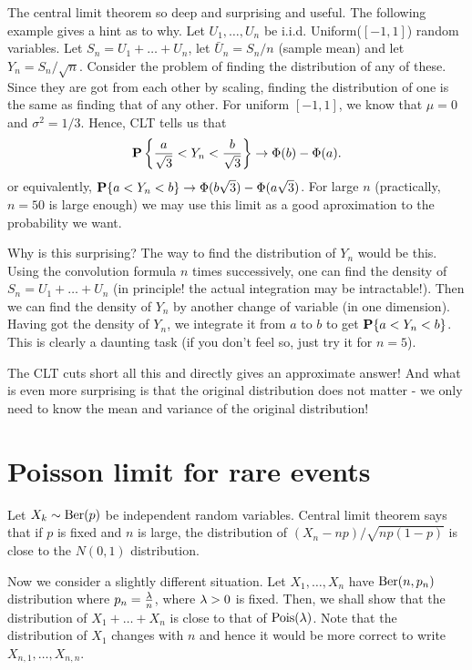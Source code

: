 \documentclass[preprint,  11pt]{amsart}
\def\sig{{\sigma}}
\begin{document}
The central limit theorem so deep and surprising and useful. The following example gives a hint as to why.
\beg Let $U_{1},\ldots ,U_{n}$ be i.i.d. Uniform($[-1,1]$) random variables. Let $S_{n}=U_{1}+\ldots +U_{n}$, let $\bar{U}_{n}=S_{n}/n$ (sample mean) and let $Y_{n}=S_{n}/\sqrt{n}$. Consider the problem of finding the distribution of any of these. Since they are got from each other by scaling, finding the distribution of one is the same as finding that of any other. For uniform $[-1,1]$, we know that $\mu=0$ and $\sig^{2}=1/3$. Hence, CLT tells us that
$$
\P\l\{\frac{a}{\sqrt{3}}<Y_{n}<\frac{b}{\sqrt{3}}\r\}\to \Phi(b)-\Phi(a).
$$
or equivalently, $\P\{a<Y_{n}<b\}\to \Phi(b\sqrt{3})-\Phi(a\sqrt{3})$. For large $n$ (practically, $n=50$ is large enough) we may use this limit as a good aproximation to the probability we want.

Why is this surprising? The way to find the distribution of $Y_{n}$ would be this. Using the convolution formula $n$ times successively, one can find the density of $S_{n}=U_{1}+\ldots +U_{n}$ (in principle! the actual integration may be intractable!). Then we can find the density of $Y_{n}$ by another change of variable (in one dimension). Having got the density of $Y_{n}$, we integrate it from $a$ to $b$ to get $\P\{a<Y_{n}<b\}$.  This is clearly a daunting task (if you don't feel so, just try it for $n=5$). 

The CLT cuts short all this and directly gives an approximate answer! And what is even more surprising is that the original distribution does not matter - we only need to know the mean and variance of the original distribution!
\eeg

\section{Poisson limit for rare events}
Let $X_{k}\sim \mb{Ber}(p)$ be independent random variables. Central limit theorem says that if $p$ is fixed and $n$ is large, the distribution of $(X_{n}-np)/\sqrt{np(1-p)}$ is close to the  $N(0,1)$ distribution. 

Now we consider a slightly different situation. Let $X_{1},\ldots ,X_{n}$ have $\mb{Ber}(n,p_{n})$ distribution where $p_{n}=\frac{\lam}{n}$, where $\lam>0$ is fixed. Then, we shall show that the distribution of $X_{1}+\ldots +X_{n}$ is close to that of $\mb{Pois}(\lam)$. Note that the distribution of $X_{1}$ changes with $n$ and hence it would be more correct to write $X_{n,1}, \ldots ,X_{n,n}$. 
\end{document}
